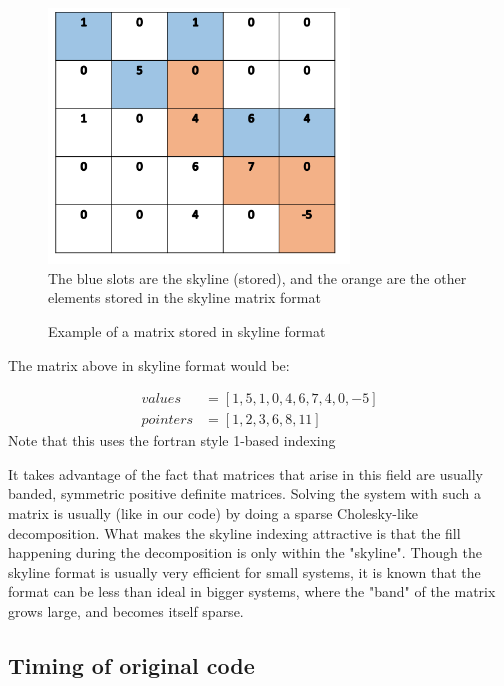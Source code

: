 \documentclass[11pt]{article}
\begin{document}
\begin{figure}[h]
\begin{center}

\caption{Example of a matrix stored in skyline format}
\includegraphics[width=8cm]{skyline}
\label{fig:skyline}
\\
The blue slots are the skyline (stored), and the orange are the other elements stored in the skyline matrix format
\end{center}

\end{figure}
The matrix above in skyline format would be:

\begin{align}
values&=[1,5,1,0,4,6,7,4,0,-5]\\
pointers&= [1,2,3,6,8,11] 
\end{align}
Note that this uses the fortran style 1-based indexing

 It takes advantage of the fact that matrices that arise in this field are usually banded, symmetric positive definite matrices. Solving the system with such a matrix is usually (like in our code) by doing a sparse Cholesky-like decomposition. What makes the skyline indexing attractive is that the fill happening during the decomposition is only within the "skyline".
Though the skyline format is usually very efficient for small systems, it is known that the format can be less than ideal in bigger systems, where the "band" of the matrix grows large, and becomes itself  sparse.

\subsection{Timing of original code}
\end{document}
